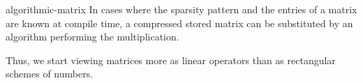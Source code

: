 \begin{Remark}{algorithmic-matrix}
  In cases where the sparsity pattern and the entries of a matrix are
  known at compile time, a compressed stored matrix can be substituted
  by an algorithm performing the multiplication.

  Thus, we start viewing matrices more as linear operators than as
  rectangular schemes of numbers.
\end{Remark}
